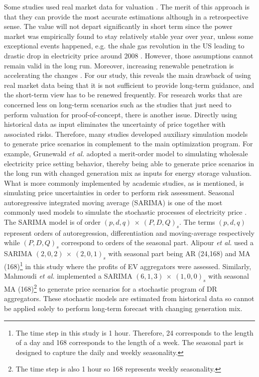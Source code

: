Some studies used real market data for valuation \cite{Walawalkar2007,Sioshansi2009,Byrne2012,Bradbury2014,McConnell2015,Berrada2016,Salles2017}. The merit of this approach is that they can provide the most accurate estimations although in a retrospective sense. The value will not depart significantly in short term since the power market was empirically found to stay relatively stable year over year, unless some exceptional events happened, e.g. the shale gas revolution in the US leading to drastic drop in electricity price around 2008 \cite{Brown2015,Salles2017}. However, those assumptions cannot remain valid in the long run. Moreover, increasing renewable penetration is accelerating the changes \cite{Woo2011,Gelabert2011,Mulder2013,Forrest2013,Wurzburg2013,Clo2015,Cludius2014}. 
For our study, this reveals the main drawback of using real market data being that it is not sufficient to provide long-term guidance, and the short-term view has to be renewed frequently. For research works that are concerned less on long-term scenarios such as the studies that just need to perform valuation for proof-of-concept, there is another issue. Directly using historical data as input eliminates the uncertainty of price together with associated risks.
Therefore, many studies developed auxiliary simulation models to generate price scenarios in complement to the main optimization program. For example, Grunewald \textit{et al.} \cite{Grunewald2012a} adopted a merit-order model to simulating wholesale electricity price setting behavior, thereby being able to generate price scenarios in the long run with changed generation mix as inputs for energy storage valuation. What is more commonly implemented by academic studies, as is mentioned, is simulating price uncertainties  in order to perform risk assessment. Seasonal autoregressive integrated moving average (SARIMA) is one of the most commonly used models to simulate the stochastic processes of electricity price \cite{Weron2014,Ziel2015,Mahmoudi2017,Alipour2017}. The SARIMA model is of order $(p,d,q)~\times~(P,D,Q)_s$. The terms $(p,d,q)$ represent orders of autoregression, differentiation and moving-average respectively while $(P,D,Q)_s$ correspond to orders of the seasonal part.
Alipour \textit{et al.} used a SARIMA $(2,0,2)~\times~(2,0,1)_s$ with seasonal part being AR (24,168) and MA (168)\footnote{The time step in this study is 1 hour. Therefore, 24 corresponds to the length of a day and 168 corresponds to the length of a week. The seasonal part is designed to capture the daily and weekly seasonality.} in this study where the profits of EV aggregators were assessed. Similarly, Mahmoudi \textit{et al.} \cite{Mahmoudi2017} implemented a SARIMA $(6,1,3)~\times~(1,0,0)_s$ with seasonal MA (168)\footnote{The time step is also 1 hour so 168 represents weekly seasonality.} to generate price scenarios for a stochastic program of DR aggregators. These stochastic models are estimated from historical data so cannot be applied solely to perform long-term forecast with changing generation mix.


